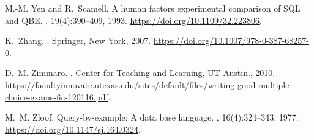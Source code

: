 \documentclass[letterpaper,11pt]{article}
\begin{document}
\begin{thebibliography}{100}
M.-M. Yen and R.~Scamell.
\newblock A human factors experimental comparison of {SQL} and {QBE}.
, 19(4):390--409,
  1993.
\newblock \url{https://doi.org/10.1109/32.223806}.

K.~Zhang.
.
\newblock Springer, New York, 2007.
\newblock \url{https://doi.org/10.1007/978-0-387-68257-0}.

D.~M. Zimmaro.
.
\newblock Center for Teaching and Learning, UT Austin., 2010.
\newblock
  \url{https://facultyinnovate.utexas.edu/sites/default/files/writing-good-multiple-choice-exams-fic-120116.pdf}.

M.~M. Zloof.
\newblock Query-by-example: A data base language.
, 16(4):324--343, 1977.
\newblock \url{https://doi.org/10.1147/sj.164.0324}.

\end{thebibliography}
\end{document}
